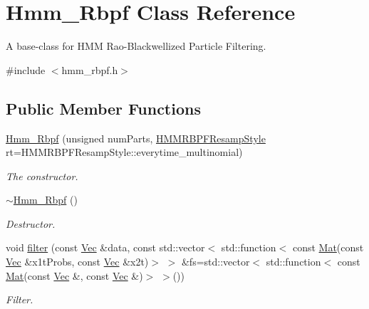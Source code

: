 \hypertarget{classHmm__Rbpf}{}\section{Hmm\+\_\+\+Rbpf Class Reference}
\label{classHmm__Rbpf}


A base-\/class for H\+MM Rao-\/\+Blackwellized Particle Filtering.  




{\ttfamily \#include $<$hmm\+\_\+rbpf.\+h$>$}

\subsection*{Public Member Functions}
\begin{DoxyCompactItemize}
\item 
\hyperlink{classHmm__Rbpf_aedf2a5840e7bd0a558aaa89603eab76e}{Hmm\+\_\+\+Rbpf} (unsigned num\+Parts, \hyperlink{hmm__rbpf_8h_aa0729d190f1f8b76b203466a41f1505f}{H\+M\+M\+R\+B\+P\+F\+Resamp\+Style} rt=H\+M\+M\+R\+B\+P\+F\+Resamp\+Style\+::everytime\+\_\+multinomial)
\begin{DoxyCompactList}\small\item\em The constructor. \end{DoxyCompactList}\item 
\hyperlink{classHmm__Rbpf_a5bcc8f6c36cbbb6e7fabfe85bca9136f}{$\sim$\+Hmm\+\_\+\+Rbpf} ()
\begin{DoxyCompactList}\small\item\em Destructor. \end{DoxyCompactList}\item 
void \hyperlink{classHmm__Rbpf_a74266bf4053458eb0be03d5849144375}{filter} (const \hyperlink{apf__filter_8h_a4c7df05c6f5e8a0d15ae14bcdbc07152}{Vec} \&data, const std\+::vector$<$ std\+::function$<$ const \hyperlink{apf__filter_8h_ae601f56a556993079f730483c574356f}{Mat}(const \hyperlink{apf__filter_8h_a4c7df05c6f5e8a0d15ae14bcdbc07152}{Vec} \&x1t\+Probs, const \hyperlink{apf__filter_8h_a4c7df05c6f5e8a0d15ae14bcdbc07152}{Vec} \&x2t)$>$ $>$ \&fs=std\+::vector$<$ std\+::function$<$ const \hyperlink{apf__filter_8h_ae601f56a556993079f730483c574356f}{Mat}(const \hyperlink{apf__filter_8h_a4c7df05c6f5e8a0d15ae14bcdbc07152}{Vec} \&, const \hyperlink{apf__filter_8h_a4c7df05c6f5e8a0d15ae14bcdbc07152}{Vec} \&)$>$ $>$())
\begin{DoxyCompactList}\small\item\em Filter. \end{DoxyCompactList}\item 

\end{DoxyCompactItemize}
